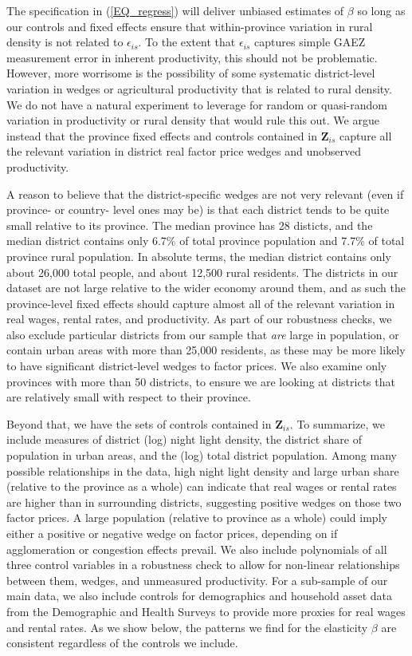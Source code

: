 \documentclass[11pt]{article}
\begin{document}
The specification in (\ref{EQ_regress}) will deliver unbiased estimates of $\beta$ so long as our controls and fixed effects ensure that within-province variation in rural density is not related to $\epsilon_{is}$. To the extent that $\epsilon_{is}$ captures simple GAEZ measurement error in inherent productivity, this should not be problematic. However, more worrisome is the possibility of some systematic district-level variation in wedges or agricultural productivity that is related to rural density. We do not have a natural experiment to leverage for random or quasi-random variation in productivity or rural density that would rule this out. We argue instead that the province fixed effects and controls contained in $\mathbf{Z}_{is}$ capture all the relevant variation in district real factor price wedges and unobserved productivity. 

A reason to believe that the district-specific wedges are not very relevant (even if province- or country- level ones may be) is that each district tends to be quite small relative to its province. The median province has 28 disticts, and the median district contains only 6.7\% of total province population and 7.7\% of total province rural population. In absolute terms, the median district contains only about 26,000 total people, and about 12,500 rural residents. The districts in our dataset are not large relative to the wider economy around them, and as such the province-level fixed effects should capture almost all of the relevant variation in real wages, rental rates, and productivity. As part of our robustness checks, we also exclude particular districts from our sample that \textit{are} large in population, or contain urban areas with more than 25,000 residents, as these may be more likely to have significant district-level wedges to factor prices. We also examine only provinces with more than 50 districts, to ensure we are looking at districts that are relatively small with respect to their province.

Beyond that, we have the sets of controls contained in $\mathbf{Z}_{is}$. To summarize, we include measures of district (log) night light density, the district share of population in urban areas, and the (log) total district population. Among many possible relationships in the data, high night light density and large urban share (relative to the province as a whole) can indicate that real wages or rental rates are higher than in surrounding districts, suggesting positive wedges on those two factor prices. A large population (relative to province as a whole) could imply either a positive or negative wedge on factor prices, depending on if agglomeration or congestion effects prevail. We also include polynomials of all three control variables in a robustness check to allow for non-linear relationships between them, wedges, and unmeasured productivity. For a sub-sample of our main data, we also include controls for demographics and household asset data from the Demographic and Health Surveys to provide more proxies for real wages and rental rates. As we show below, the patterns we find for the elasticity $\beta$ are consistent regardless of the controls we include.
\end{document}
